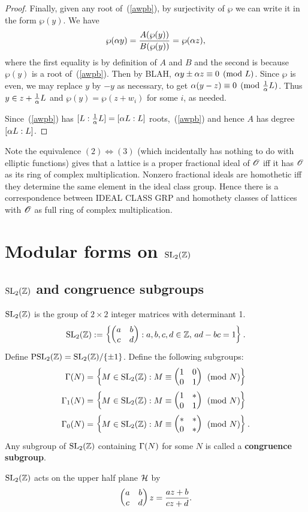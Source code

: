 \begin{proof}
Finally, given any root of~(\ref{awpb}), by surjectivity of $\wp$ we can write it in the form $\wp(y)$. We have
\[
\wp(\al y)=\frac{A(\wp(y))}{B(\wp(y))}=\wp(\al z),
\]
where the first equality is by definition of $A$ and $B$ and the second is because $\wp(y)$ is a root of~(\ref{awpb}). Then by BLAH, $\al y\pm \al z\equiv 0\pmod{L}$. Since $\wp$ is even, we may replace $y$ by $-y$ as necessary, to get $\al(y-z)\equiv 0\pmod{\rc{\al} L}$. Thus  $y\in z+\rc{\al}L$ and $\wp(y)=\wp(z+w_i)$ for some $i$, as needed.

Since~(\ref{awpb}) has $[L:\rc{\al}L]=[\al L:L]$ roots,~(\ref{awpb}) and hence $A$ has degree $[\al L:L]$.
\end{proof}

Note the equivalence $(2)\iff (3)$ (which incidentally has nothing to do with elliptic functions) gives that a lattice is a proper fractional ideal of $\sO$ iff it has $\sO$ as its ring of complex multiplication. Nonzero fractional ideals are homothetic iff they determine the same element in the ideal class group. Hence there is a correspondence between IDEAL CLASS GRP and homothety classes of lattices with $\sO$ as full ring of complex multiplication.

\chapter{Modular forms on $\SL_2(\Z)$}
\section{$\SL_2(\Z)$ and congruence subgroups}
\begin{df}
$\SL_2(\Z)$ is the group of $2\times 2$ integer matrices with determinant 1.
\[
\SL_2(\Z):=\set{\matt abcd}{a,b,c,d\in \Z, \, ad-bc=1}.
\]
Define $\PSL_2(\Z)=\SL_2(\Z)/\{\pm 1\}$.
Define the following subgroups:
\begin{align*}
\Ga(N)&=\set{M\in \SL_2(\Z)}{M\equiv \matt 1001\pmod{N}}\\
\Ga_1(N)&=\set{M\in \SL_2(\Z)}{M\equiv \matt 1*01\pmod{N}}\\
\Ga_0(N)&=\set{M\in \SL_2(\Z)}{M\equiv \matt **0* \pmod{N}}.
\end{align*}
Any subgroup of $\SL_2(\Z)$ containing $\Ga(N)$ for some $N$ is called a \textbf{congruence subgroup}.
\end{df}
\begin{df}
$\SL_2(\Z)$ acts on the upper half plane $\cal H$ by
\[
\matt abcd z=\frac{az+b}{cz+d}.
\]
\end{df}

